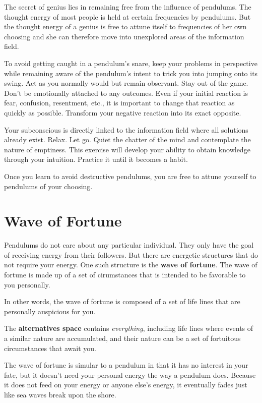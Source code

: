 \documentclass[
  openany]{book}
\begin{document}
The secret of genius lies in remaining free from the influence of pendulums. The thought energy of most people is held at certain frequencies by pendulums. But the thought energy of a genius is free to attune itself to frequencies of her own choosing and she can therefore move into unexplored areas of the information field.

To avoid getting caught in a pendulum's snare, keep your problems in perspective while remaining aware of the pendulum's intent to trick you into jumping onto its swing. Act as you normally would but remain observant. Stay out of the game. Don't be emotionally attached to any outcomes. Even if your initial reaction is fear, confusion, resentment, etc., it is important to change that reaction as quickly as possible. Transform your negative reaction into its exact opposite.

Your subconscious is directly linked to the information field where all solutions already exist. Relax. Let go. Quiet the chatter of the mind and contemplate the nature of emptiness. This exercise will develop your ability to obtain knowledge through your intuition. Practice it until it becomes a habit.

Once you learn to avoid destructive pendulums, you are free to attune yourself to pendulums of your choosing.

\hypertarget{wave-of-fortune}{%
\chapter{Wave of Fortune}\label{wave-of-fortune}}

Pendulums do not care about any particular individual. They only have the goal of receiving energy from their followers. But there are energetic structures that do not require your energy. One such structure is the \textbf{wave of fortune}. The wave of fortune is made up of a set of cirumstances that is intended to be favorable to you personally.

In other words, the wave of fortune is composed of a set of life lines that are personally auspicious for you.

The \textbf{alternatives space} contains \emph{everything}, including life lines where events of a similar nature are accumulated, and their nature can be a set of fortuitous circumstances that await you.

The wave of fortune is simular to a pendulum in that it has no interest in your fate, but it doesn't need your personal energy the way a pendulum does. Because it does not feed on your energy or anyone else's energy, it eventually fades just like sea waves break upon the shore.
\end{document}

